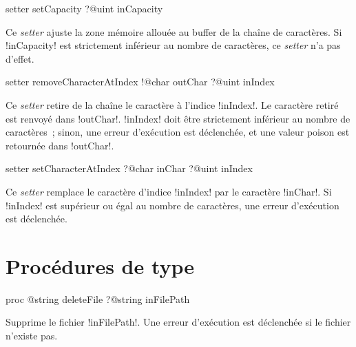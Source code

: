 
\begin{galgasbox}
setter setCapacity ?@uint inCapacity
\end{galgasbox}


Ce \emph{setter} ajuste la zone mémoire allouée au buffer de la chaîne de caractères. Si \ggs!inCapacity! est strictement inférieur au nombre de caractères, ce \emph{setter} n'a pas d'effet.







\begin{galgasbox}
setter removeCharacterAtIndex
   !@char outChar
   ?@uint inIndex
\end{galgasbox}


Ce \emph{setter} retire de la chaîne le caractère à l'indice \ggs!inIndex!. Le caractère retiré est renvoyé dans \ggs!outChar!. \ggs!inIndex! doit être strictement inférieur au nombre de caractères~; sinon, une erreur d'exécution est déclenchée, et une valeur poison est retournée dans \ggs!outChar!. 







\begin{galgasbox}
setter setCharacterAtIndex
   ?@char inChar
   ?@uint inIndex
\end{galgasbox}


Ce \emph{setter} remplace le caractère d'indice \ggs!inIndex! par le caractère \ggs!inChar!. Si \ggs!inIndex! est supérieur ou égal au nombre de caractères, une erreur d'exécution est déclenchée. 




\section{Procédures de type}




\begin{galgasbox}
proc @string deleteFile ?@string inFilePath
\end{galgasbox}

Supprime le fichier \ggs!inFilePath!. Une erreur d'exécution est déclenchée si le fichier n'existe pas.




